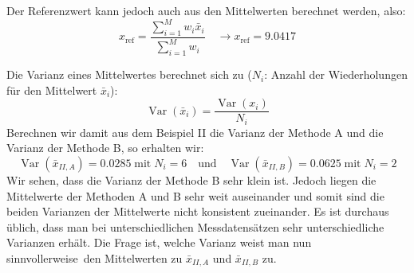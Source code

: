 Der Referenzwert kann jedoch auch aus den Mittelwerten berechnet
werden, also: 
\begin{equation}
 x_\mathrm{ref} = \frac{\sum\limits_{i=1}^M w_i \bar x_i}{\sum\limits_{i=1}^M w_i} 
 \quad \rightarrow  x_\mathrm{ref} = 9.0417
 \label{eq:Referenzwert_Mittelwerte}
\end{equation}
 
 Die Varianz eines Mittelwertes berechnet sich zu ($N_i$: Anzahl der Wiederholungen für den Mittelwert $\bar x_i$): 
 \begin{equation}
\operatorname{Var}(\bar x_i) = \frac{\operatorname{Var}(x_i)}{N_i}
 \end{equation}
 Berechnen wir damit aus dem Beispiel II die Varianz der Methode A und
 die Varianz der Methode B, so erhalten wir: 
\begin{equation}
 \operatorname{Var}(\bar x_{II,A}) = 0.0285 \; \text{mit} \; N_i = 6 \quad \text{und} \quad 
 \operatorname{Var}(\bar x_{II,B}) = 0.0625 \; \text{mit} \; N_i = 2
\end{equation}
Wir sehen, dass die Varianz der Methode B sehr klein ist. Jedoch liegen die 
Mittelwerte der Methoden A und B sehr weit auseinander und somit sind 
die beiden Varianzen der Mittelwerte nicht konsistent zueinander. Es ist durchaus üblich, dass man bei unterschiedlichen Messdatensätzen sehr 
unterschiedliche Varianzen erhält. Die Frage ist, welche Varianz weist man 
nun \glqq sinnvollerweise\grqq~den Mittelwerten zu $\bar x_{II,A}$ und $\bar x_{II,B}$ zu.
 
